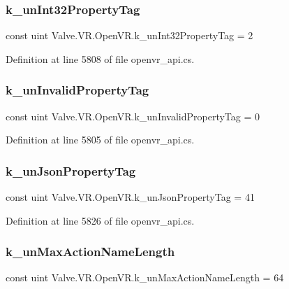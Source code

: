 \subsubsection{\texorpdfstring{k\_unInt32PropertyTag}{k\_unInt32PropertyTag}}
{\footnotesize\ttfamily const uint Valve.\+V\+R.\+Open\+V\+R.\+k\+\_\+un\+Int32\+Property\+Tag = 2}



Definition at line 5808 of file openvr\+\_\+api.\+cs.

\mbox{\label{class_valve_1_1_v_r_1_1_open_v_r_a4305b63d15a65c8a51c1d56ff2193567}} 
\subsubsection{\texorpdfstring{k\_unInvalidPropertyTag}{k\_unInvalidPropertyTag}}
{\footnotesize\ttfamily const uint Valve.\+V\+R.\+Open\+V\+R.\+k\+\_\+un\+Invalid\+Property\+Tag = 0}



Definition at line 5805 of file openvr\+\_\+api.\+cs.

\mbox{\label{class_valve_1_1_v_r_1_1_open_v_r_a08ca9066783ee9137a554abe69b56379}} 
\subsubsection{\texorpdfstring{k\_unJsonPropertyTag}{k\_unJsonPropertyTag}}
{\footnotesize\ttfamily const uint Valve.\+V\+R.\+Open\+V\+R.\+k\+\_\+un\+Json\+Property\+Tag = 41}



Definition at line 5826 of file openvr\+\_\+api.\+cs.

\mbox{\label{class_valve_1_1_v_r_1_1_open_v_r_ae56640716625cacf0f2f02b90987bf1e}} 
\subsubsection{\texorpdfstring{k\_unMaxActionNameLength}{k\_unMaxActionNameLength}}
{\footnotesize\ttfamily const uint Valve.\+V\+R.\+Open\+V\+R.\+k\+\_\+un\+Max\+Action\+Name\+Length = 64}



